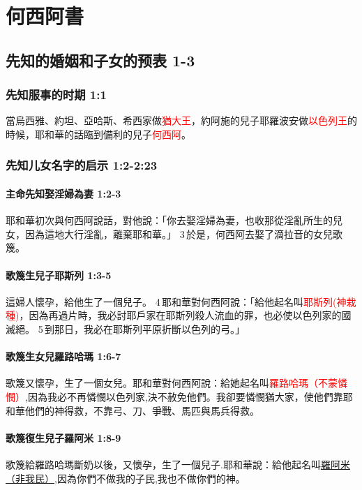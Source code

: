 
\chapter{何西阿書}

\section{先知的婚姻和子女的预表 1-3}

\subsection{先知服事的时期 1:1}
當烏西雅、約坦、亞哈斯、希西家做\textcolor{red}{猶大王}，約阿施的兒子耶羅波安做\textcolor{red}{以色列王}的時候，耶和華的話臨到備利的兒子\textcolor{red}{何西阿}。

 
\subsection{先知儿女名字的启示 1:2-2:23}
\subsubsection{主命先知娶淫婦為妻 1:2-3}
耶和華初次與何西阿說話，對他說：「你去娶淫婦為妻，也收那從淫亂所生的兒女，因為這地大行淫亂，離棄耶和華。」 3 於是，何西阿去娶了滴拉音的女兒歌篾。

\subsubsection{歌篾生兒子耶斯列 1:3-5}
這婦人懷孕，給他生了一個兒子。 4 耶和華對何西阿說：「給他起名叫\textcolor{red}{耶斯列(神栽種)}，因為再過片時，我必討耶戶家在耶斯列殺人流血的罪，也必使以色列家的國滅絕。 5 到那日，我必在耶斯列平原折斷以色列的弓。」

\subsubsection{歌篾生女兒羅路哈瑪 1:6-7}
歌篾又懷孕，生了一個女兒。耶和華對何西阿說：給她起名叫\textcolor{red}{羅路哈瑪（不蒙憐憫）},因為我必不再憐憫以色列家,決不赦免他們。我卻要憐憫猶大家，使他們靠耶和華他們的神得救，不靠弓、刀、爭戰、馬匹與馬兵得救。

\subsubsection{歌篾復生兒子羅阿米 1:8-9}
歌篾給羅路哈瑪斷奶以後，又懷孕，生了一個兒子.耶和華說：給他起名叫\underline{羅阿米（非我民）},因為你們不做我的子民,我也不做你們的神。 

